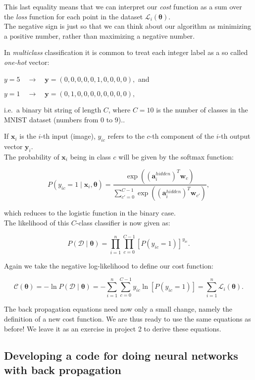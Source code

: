 \documentclass[11pt]{article}
\begin{document}
    This last equality means that we can interpret our \emph{cost} function
as a sum over the \emph{loss} function for each point in the dataset
\(\mathcal{L}_i(\boldsymbol{\theta})\).\\
The negative sign is just so that we can think about our algorithm as
minimizing a positive number, rather than maximizing a negative number.

In \emph{multiclass} classification it is common to treat each integer
label as a so called \emph{one-hot} vector:

\(y = 5 \quad \rightarrow \quad \boldsymbol{y} = (0, 0, 0, 0, 0, 1, 0, 0, 0, 0) ,\)
and

\(y = 1 \quad \rightarrow \quad \boldsymbol{y} = (0, 1, 0, 0, 0, 0, 0, 0, 0, 0) ,\)

i.e.~a binary bit string of length \(C\), where \(C = 10\) is the number
of classes in the MNIST dataset (numbers from \(0\) to \(9\))..

If \(\boldsymbol{x}_i\) is the \(i\)-th input (image), \(y_{ic}\) refers
to the \(c\)-th component of the \(i\)-th output vector
\(\boldsymbol{y}_i\).\\
The probability of \(\boldsymbol{x}_i\) being in class \(c\) will be
given by the softmax function:

    \[
P(y_{ic} = 1 \mid \boldsymbol{x}_i, \boldsymbol{\theta}) = \frac{\exp{((\boldsymbol{a}_i^{hidden})^T \boldsymbol{w}_c)}}
{\sum_{c'=0}^{C-1} \exp{((\boldsymbol{a}_i^{hidden})^T \boldsymbol{w}_{c'})}} ,
\]

    which reduces to the logistic function in the binary case.\\
The likelihood of this \(C\)-class classifier is now given as:

    \[
P(\mathcal{D} \mid \boldsymbol{\theta}) = \prod_{i=1}^n \prod_{c=0}^{C-1} [P(y_{ic} = 1)]^{y_{ic}} .
\]

    Again we take the negative log-likelihood to define our cost function:

    \[
\mathcal{C}(\boldsymbol{\theta}) = - \ln P(\mathcal{D} \mid \boldsymbol{\theta}) = - \sum_{i=1}^n \sum_{c=0}^{C-1}
y_{ic} \ln[P(y_{ic} = 1)] = \sum_{i=1}^n
\mathcal{L}_i(\boldsymbol{\theta}) .
\]

    The back propagation equations need now only a small change, namely the
definition of a new cost function. We are thus ready to use the same
equations as before! We leave it as an exercise in project 2 to derive
these equations.

\hypertarget{developing-a-code-for-doing-neural-networks-with-back-propagation}{%
\subsection{Developing a code for doing neural networks with back
propagation}\label{developing-a-code-for-doing-neural-networks-with-back-propagation}}
\end{document}
